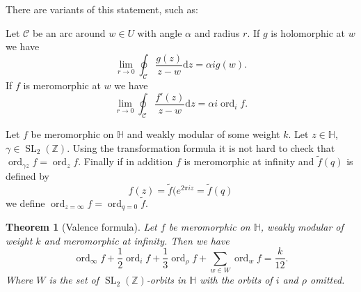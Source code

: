\documentclass{article}
\newtheorem*{thm}{Theorem}
\theoremstyle{definition}
\DeclareMathOperator{\SL}{SL}
\DeclareMathOperator{\ord}{ord}
\begin{document}
There are variants of this statement, such as:

Let $\mathcal{C}$ be an arc around $w\in U$ with angle $\alpha$ and radius $r$.
If $g$ is holomorphic at $w$ we have 
\[\lim_{r\to 0} \oint_{\mathcal{C}}\frac{g(z)}{z-w}\mathrm{d}z = \alpha i g(w).\]
If $f$ is meromorphic at $w$ we have 
\[\lim_{r\to 0} \oint_{\mathcal{C}}\frac{f'(z)}{z-w}\mathrm{d}z = \alpha i \ord_i f.\]

Let $f$ be meromorphic on $\mathbb{H}$ and weakly modular of some weight $k$.
Let $z\in \mathbb{H}$, $\gamma\in\SL_2(\mathbb{Z})$.
Using the transformation formula it is not hard to check that $\ord_{\gamma z} f = \ord_z f$.
Finally if in addition $f$ is meromorphic at infinity and $\tilde{f}(q)$ is defined by
\[f(z) = \tilde{f}(e^{2\pi i z} = \tilde{f}(q)\]
we define $\ord_{z=\infty} f = \ord_{q=0} \tilde{f}$.

\begin{thm}[Valence formula]
Let $f$ be meromorphic on $\mathbb{H}$, weakly modular of weight $k$ and meromorphic at infinity.
Then we have 
\[\ord_\infty f + \frac{1}{2}\ord_i f + \frac{1}{3} \ord_\rho f + \sum_{w\in W}\ord_w f = \frac{k}{12}.\]
Where $W$ is the set of $\SL_2(\mathbb{Z})$-orbits in $\mathbb{H}$ with the orbits of $i$ and $\rho$ omitted.
\end{thm}
\end{document}
